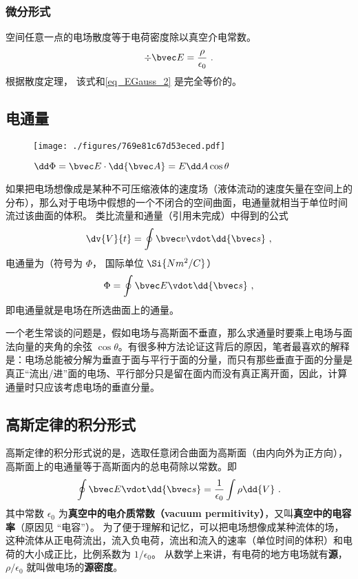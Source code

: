 \subsubsection{微分形式}
空间任意一点的电场散度等于电荷密度除以真空介电常数。
\begin{equation}\label{eq_EGauss_1}
\div \bvec E = \frac{\rho}{\epsilon_0}~.
\end{equation}
根据散度定理， 该式和\autoref{eq_EGauss_2} 是完全等价的。

\subsection{电通量}
\begin{figure}[ht]
\centering
\texttt{[image: ./figures/769e81c67d53eced.pdf]}
\caption{$\dd \Phi = \bvec E \cdot \dd {\bvec A} = E \dd A \cos \theta$} \label{fig_EGauss1}
\end{figure}
如果把电场想像成是某种不可压缩液体的速度场（液体流动的速度矢量在空间上的分布），那么对于电场中假想的一个不闭合的空间曲面，电通量就相当于单位时间流过该曲面的体积。
类比流量和通量（引用未完成）中得到的公式
\begin{equation}
\dv{V}{t} = \oint \bvec v \vdot \dd{\bvec s}~,
\end{equation} 
电通量为（符号为 $\Phi $， 国际单位 $\Si{N m^2/C}$）
\begin{equation}
\Phi  = \oint \bvec E \vdot \dd{\bvec s}~,
\end{equation} 
即电通量就是电场在所选曲面上的通量。

一个老生常谈的问题是，假如电场与高斯面不垂直，那么求通量时要乘上电场与面法向量的夹角的余弦 $\cos \theta$。有很多种方法论证这背后的原因，笔者最喜欢的解释是：电场总能被分解为垂直于面与平行于面的分量，而只有那些垂直于面的分量是真正“流出/进”面的电场、平行部分只是留在面内而没有真正离开面，因此，计算通量时只应该考虑电场的垂直分量。

\subsection{高斯定律的积分形式}

高斯定律的积分形式说的是，选取任意闭合曲面为高斯面（由内向外为正方向），高斯面上的电通量等于高斯面内的总电荷除以常数。即
\begin{equation}\label{eq_EGauss_5}
\oint \bvec E \vdot \dd{\bvec s}  = \frac{1}{\epsilon_0} \int \rho \dd{V}~.
\end{equation} 
其中常数 $\epsilon_0$ 为\textbf{真空中的电介质常数（vacuum permitivity）}，又叫\textbf{真空中的电容率}（原因见 “电容”）。 为了便于理解和记忆，可以把电场想像成某种流体的场，这种流体从正电荷流出，流入负电荷，流出和流入的速率（单位时间的体积）和电荷的大小成正比，比例系数为 $1/\epsilon_0$。 从数学上来讲，有电荷的地方电场就有\textbf{源}， $\rho /\epsilon_0$ 就叫做电场的\textbf{源密度}。

